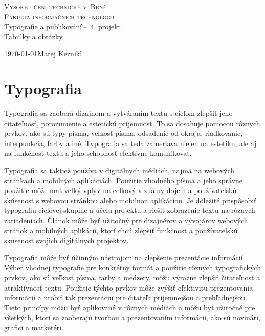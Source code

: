 \documentclass[a4paper, 11pt]{article}
\begin{document}
\begin{titlepage}
	\begin{center} 
		\textsc{\Huge Vysoké učení technické v~Brně\\
			\huge Fakulta informačních technologií \\}
			\LARGE Typografie a publikování\,--\ 4. projekt\\
			\Huge Tabulky a obrázky
			\end{center}
			\Large \today \hfill Matej Keznikl
\end{titlepage}


\section{Typografia}
Typografia sa zaoberá dizajnom a vytváraním textu s cieľom zlepšiť jeho čitateľnosť, porozumenie a estetickú príjemnosť. To sa dosahuje pomocou rôznych prvkov, ako sú typy písma, veľkosť písma, odsadenie od okraja, riadkovanie, interpunkcia, farby a iné. Typografia sa teda zameriava nielen na estetiku, ale aj na funkčnosť textu a jeho schopnosť efektívne komunikovať. \cite{KNUTH}


Typografia sa taktiež používa v digitálnych médiách, najmä na webových stránkach a mobilných aplikáciách. Použitie vhodného písma a jeho správne použitie môže mať veľký vplyv na celkový vizuálny dojem a používateľskú skúsenosť s webovou stránkou alebo mobilnou aplikáciou. Je dôležité prispôsobiť typografiu cieľovej skupine a účelu projektu a riešiť zobrazenie textu na rôznych zariadeniach. Článok môže byť užitočný pre dizajnérov a vývojárov webových stránok a mobilných aplikácií, ktorí chcú zlepšiť funkčnosť a používateľskú skúsenosť svojich digitálnych projektov. \cite{WebsiteDesign}


Typografia môže byť účinným nástrojom na zlepšenie prezentácie informácií. Výber vhodnej typografie pre konkrétny formát a použitie rôznych typografických prvkov, ako sú veľkosť písma, farby a medzery, môžu výrazne zlepšiť čitateľnosť a atraktívnosť textu. Použitie týchto prvkov môže zvýšiť efektivitu prezentovania informácií a urobiť tak prezentáciu pre čitateľa príjemnejšou a prehľadnejšou. Tieto princípy môžu byť aplikované v rôznych médiách a môžu byť užitočné pre všetkých, ktorí sa zaoberajú tvorbou a prezentovaním informácií, ako sú novinári, grafici a marketéri. \cite{NovotnaMaria2019}
\end{document}
